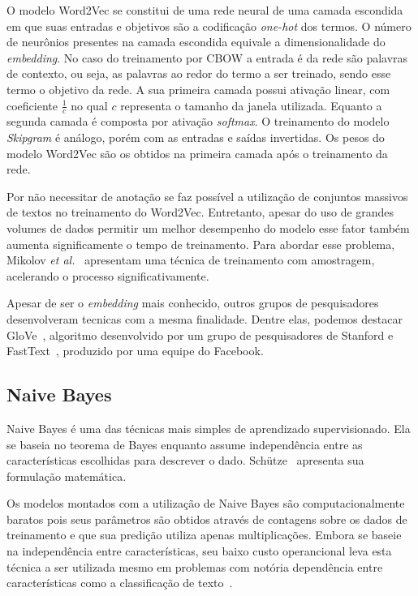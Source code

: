 O modelo Word2Vec se constitui de uma rede neural de uma camada escondida em que suas entradas e objetivos são a
codificação \textit{one-hot} dos termos.
O número de neurônios presentes na camada escondida equivale a dimensionalidade do \textit{embedding}.
No caso do treinamento por CBOW a entrada é da rede são palavras de contexto, ou seja, as palavras ao redor do termo a
ser treinado, sendo esse termo o objetivo da rede.
A sua primeira camada possui ativação linear, com coeficiente $\frac{1}{c}$ no qual $c$ representa o tamanho da janela
utilizada.
Equanto a segunda camada é composta por ativação \textit{softmax}.
O treinamento do modelo \textit{Skipgram} é análogo, porém com as entradas e saídas invertidas.
Os pesos do modelo Word2Vec são os obtidos na primeira camada após o treinamento da rede.

Por não necessitar de anotação se faz possível a utilização de conjuntos massivos de textos no treinamento do Word2Vec.
Entretanto, apesar do uso de grandes volumes de dados permitir um melhor desempenho do modelo esse fator também aumenta
significamente o tempo de treinamento.
Para abordar esse problema, Mikolov \textit{et al.}~\cite{mikolov13b} apresentam uma técnica de treinamento com
amostragem, acelerando o processo significativamente.

Apesar de ser o \textit{embedding} mais conhecido, outros grupos de pesquisadores desenvolveram tecnicas com a mesma
finalidade.
Dentre elas, podemos destacar GloVe~\cite{pennington14}, algoritmo desenvolvido por um grupo de pesquisadores de Stanford
e FastText~\cite{bojanowski16}, produzido por uma equipe do Facebook.

\subsection{Naive Bayes}

Naive Bayes é uma das técnicas mais simples de aprendizado supervisionado.
Ela se baseia no teorema de Bayes enquanto assume independência entre as características escolhidas para descrever o dado.
Schütze~\cite{schutze08} apresenta sua formulação matemática.

Os modelos montados com a utilização de Naive Bayes são computacionalmente baratos pois seus parâmetros são obtidos
através de contagens sobre os dados de treinamento e que sua predição utiliza apenas multiplicações.
Embora se baseie na independência entre características, seu baixo custo operancional leva esta técnica a ser utilizada
mesmo em problemas com notória dependência entre características como a classificação de texto~\cite{mccallum98}.

